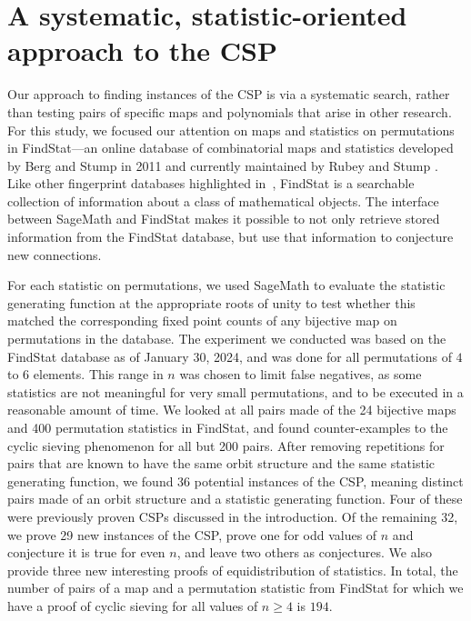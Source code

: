 \documentclass{amsart}
\theoremstyle{definition}
\newcommand{\Findstat}{{FindStat}\xspace}
\begin{document}

\section{A systematic, statistic-oriented approach to the CSP}
\label{sec:methods}
Our approach to finding instances of the CSP is via a systematic search, rather than testing pairs of specific maps and polynomials that arise in other research. For this study, we focused our attention on maps and statistics on permutations in \Findstat---an online database of combinatorial maps and statistics developed by Berg and  Stump in 2011 and currently maintained by Rubey and Stump \cite{findstat}.  Like other fingerprint databases highlighted in~\cite{fingerprint}, \Findstat is a searchable collection of information about a class of mathematical objects.  
The interface between SageMath \cite{sage} and \Findstat makes it possible to not only retrieve stored information from the \Findstat database, but use that information to conjecture new connections.

For each statistic on permutations, we used SageMath to evaluate the statistic generating function at the appropriate roots of unity to test whether this matched the corresponding fixed point counts of any bijective map on permutations in the database. The experiment we conducted was based on the \Findstat database as of January 30, 2024, and was done for all permutations of $4$ to $6$ elements. This range in $n$ was chosen to limit false negatives, as some statistics are not meaningful for very small permutations, and to be executed in a reasonable amount of time. 
We looked at all pairs made of the 24 bijective maps and 400 permutation statistics in \Findstat, and found counter-examples to the cyclic sieving phenomenon for all but 200 pairs. After removing repetitions for pairs that are known to have the same orbit structure and the same statistic generating function, we found 36 potential instances of the CSP, meaning distinct pairs made of an orbit structure and a statistic generating function. Four of these  were previously proven CSPs discussed in the introduction.
Of the remaining 32, we prove 29 new instances of the CSP, prove one for  odd values of $n$ and conjecture it is true for even $n$, and leave two others as conjectures.  We also provide three new interesting proofs of equidistribution of statistics.
In total, the number of pairs of a map and a permutation statistic from FindStat for which we have a proof of cyclic sieving for all values of $n \geq 4$ is $194$. 
\end{document}
